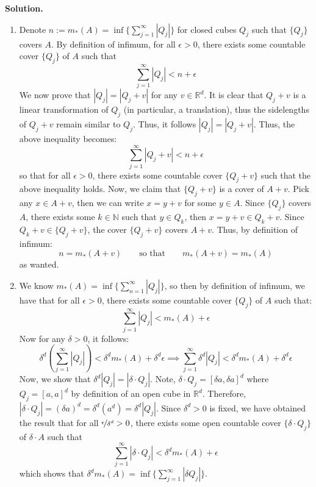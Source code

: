 \documentclass{article}
\begin{document}
    \textbf{Solution.}
    \begin{enumerate}
        \item Denote $n := m_*(A) = \inf\{\sum_{j=1}^{\infty} |Q_j|\}$ for closed cubes $Q_j$ such that $\{Q_j\}$ covers $A$.
            By definition of infimum, for all $\epsilon>0$, there exists some countable cover $\{Q_j\}$ of $A$ such that
            \[ \sum_{j=1}^{\infty} |Q_j| < n + \epsilon \]
            We now prove that $|Q_j| = |Q_j + v|$ for any $v\in\mathbb{R}^d$. It is clear that $Q_j+v$ is a linear transformation
            of $Q_j$ (in particular, a translation), thus the sidelengths of $Q_j+v$ remain similar to $Q_j$. 
            Thus, it follows $|Q_j| = |Q_j+v|$. Thus, the above inequality becomes:
            \[ \sum_{j=1}^{\infty} |Q_j + v| < n + \epsilon \]
            so that for all $\epsilon>0$, there exists some countable cover $\{Q_j+v\}$ such that the above inequality holds.
            Now, we claim that $\{Q_j+v\}$ is a cover of $A+v$. Pick any $x\in A+v$, then we can write $x=y+v$ for some $y\in A$.
            Since $\{Q_j\}$ covers $A$, there exists some $k\in\mathbb{N}$ such that $y\in Q_k$, then $x=y+v\in Q_k+v$. Since
            $Q_k+v \in \{Q_j+v\}$, the cover $\{Q_j+v\}$ covers $A+v$. Thus, by definition of infimum:
            \[ n = m_*(A+v) \qquad\text{so that}\qquad m_*(A+v) = m_*(A) \]
            as wanted.
        \item We know $m_*(A) = \inf\{\sum_{n=1}^{\infty} |Q_j|\}$, so then by definition of infimum, we have that for all
            $\epsilon>0$, there exists some countable cover $\{Q_j\}$ of $A$ such that:
            \[ \sum_{j=1}^{\infty} |Q_j| < m_*(A) + \epsilon \]
            Now for any $\delta>0$, it follows:
            \[ \delta^d(\sum_{j=1}^{\infty} |Q_j|) < \delta^dm_*(A) + \delta^d\epsilon \implies \sum_{j=1}^{\infty} \delta^d|Q_j|
                < \delta^dm_*(A) + \delta^d\epsilon\]
            Now, we show that $\delta^d|Q_j| = |\delta\cdot Q_j|$. Note, $\delta\cdot Q_j = [\delta a, \delta a]^d$ where
            $Q_j = [a,a]^d$ by definition of an open cube in $\mathbb{R}^d$. Therefore, $|\delta\cdot Q_j| = (\delta a)^d =
            \delta^d (a^d) = \delta^d |Q_j|$. Since $\delta^d>0$ is fixed, we have obtained the result that for all
            $\nicefrac{\epsilon}{\delta^d} > 0$, there exists some open countable cover $\{\delta\cdot Q_j\}$ of $\delta\cdot A$
            such that
            \[ \sum_{j=1}^{\infty} |\delta\cdot Q_j| < \delta^dm_*(A) + \epsilon \]
            which shows that $\delta^d m_*(A) = \inf\{\sum_{j=1}^{\infty} |\delta Q_j|\}$.
    \end{enumerate}
\end{document}
